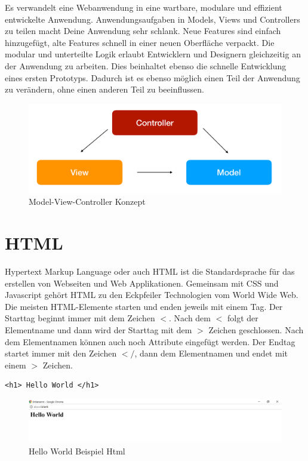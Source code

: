 Es verwandelt eine Webanwendung in eine wartbare, modulare und effizient entwickelte Anwendung. 
Anwendungsaufgaben in Models, Views und Controllers zu teilen macht Deine Anwendung sehr schlank. 
Neue Features sind einfach hinzugefügt, alte Features schnell in einer neuen Oberfläche verpackt. 
Die modular und unterteilte Logik erlaubt Entwicklern und Designern gleichzeitig an der Anwendung zu arbeiten. 
Dies beinhaltet ebenso die schnelle Entwicklung eines ersten Prototyps. 
Dadurch ist es ebenso möglich einen Teil der Anwendung zu verändern, ohne einen anderen Teil zu beeinflussen.
\begin{figure}[H]
\begin{center}
	\includegraphics[scale=.4]{images/MVC.png}
\end{center}
	\caption{Model-View-Controller Konzept}
	\label{fig:sample}
\end{figure}

\section{HTML}
Hypertext Markup Language oder auch HTML ist die Standardsprache für das erstellen von Webseiten und Web Applikationen. Gemeinsam mit CSS und Javascript gehört HTML zu den Eckpfeiler Technologien vom World Wide Web.
Die meisten HTML-Elemente starten und enden jeweils mit einem Tag. Der Starttag beginnt immer mit dem Zeichen $<$. Nach dem $<$ folgt der Elementname und dann wird der Starttag mit dem $>$ Zeichen geschlossen. Nach dem Elementnamen können auch noch Attribute eingefügt werden.
Der Endtag startet immer mit den Zeichen $</$, dann dem Elementnamen und endet mit einem $>$ Zeichen.

\begin{lstlisting}
<h1> Hello World </h1>
\end{lstlisting}

\begin{figure}[H]
\begin{center}
	\includegraphics[scale=.6]{images/html.png}
\end{center}
	\caption{Hello World Beispiel Html}
	\label{fig:sample}
\end{figure}
\pagebreak 


